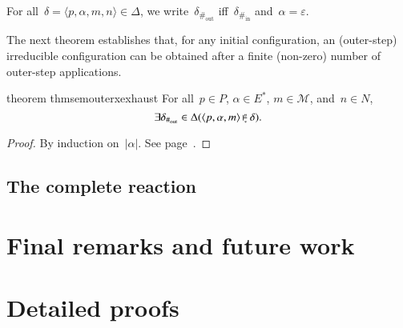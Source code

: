 \documentclass[10pt,a4paper,oneside,leqno]{article}
\makeatletter
\numberwithin{equation}{section}
\let\nil=\varepsilon
\def\<#1>{\langle#1\rangle}
\def\|#1|{\left|#1\right|}
\def\Hinner{{\#_{\mathrm{in}}}}
\def\Houter{{\#_{\mathrm{out}}}}
\def\@inner#1#2{%
  \setbox0=\hbox{$\vdash$}%
  \setbox1=\hbox{$\scriptscriptstyle#1$}%
  \setbox2=\hbox{$\scriptscriptstyle#2$}%
  \ifdim\wd1>\wd2
    \setbox2=\hbox to\wd1{\hfil$\scriptscriptstyle#2$\hfil}%
  \else
    \setbox1=\hbox to\wd2{\hfil$\scriptscriptstyle#1$\hfil}%
  \fi
  \setbox3=\hbox{$\null^{\box1}_{\box2}$}%
  \dimen0=\wd3
  \rlap{\hbox{$\vrule height\the\ht0 depth\the\dp0 width.6pt
      \vcenter{\hrule height.3pt depth.3pt width\dimen0}$}}%
  \kern1pt\box3
}
\newcommand{\inner}[2][]{\mathbin{\@inner{#2}{#1}}}
\newcommand{\innerx}[1]{\inner[\ast]{#1}}
\makeatother
\begin{document}
\begin{definition}[label={def:sem:outer:irreducible},
  name={Outer-step irreducible configuration}]
  For all~$\delta=\<p,\alpha,m,n>\in\Delta$, we write~$\delta_\Houter$
  iff~$\delta_\Hinner$ and~$\alpha=\nil$.
\end{definition}

The next theorem establishes that, for any initial configuration, an
(outer-step) irreducible configuration can be obtained after a finite
(non-zero) number of outer-step applications.

\begin{restatable}[label={thm:sem:outerx:exhaust}]{theorem}
  {thmsemouterxexhaust}
  For all~$p\in{P}$, $\alpha\in{E^*}$, $m\in\mathcal{M}$, and~$n\in{N}$,
  \[
    \exists\delta_\Houter\in\Delta(\<p,\alpha,m>\innerx{n}\delta).
  \]
\end{restatable}
\begin{proof}
  By induction on~$\|\alpha|$.  See
  page~\pageref{proof:thm:sem:outerx:exhaust}.
\end{proof}


\subsection{The complete reaction}
\label{sec:sem:react}


\section{Final remarks and future work}
\label{sec:final}


\appendix
\section{Detailed proofs}
\label{sec:proofs}
\end{document}
